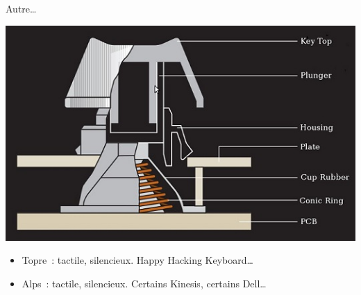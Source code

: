 \begin{frame}{Autre…}
	\begin{center}
		\includegraphics[scale=0.4]{images/hard_topre}
	\end{center}
	\begin{itemize}
		\item Topre~: tactile, silencieux. Happy Hacking Keyboard\dots
		\item Alps~: tactile, silencieux. Certains Kinesis, certains Dell\dots
	\end{itemize}
\end{frame}
